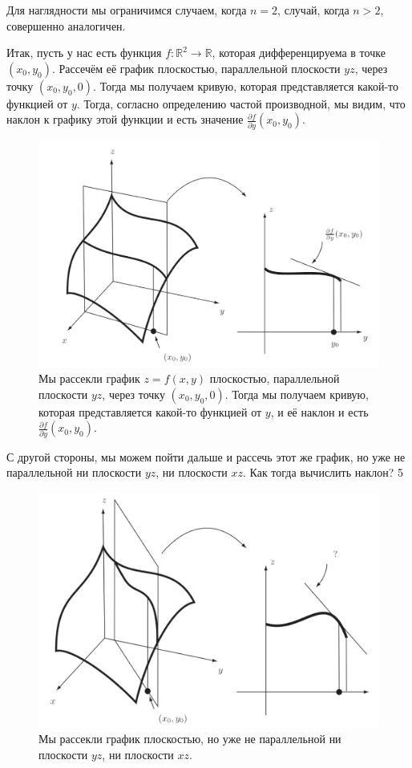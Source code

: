 Для наглядности мы ограничимся случаем, когда $n=2$, случай, когда $n >2$, совершенно аналогичен.

Итак, пусть у нас есть функция $f:\mathbb{R}^2 \to \mathbb{R}$, которая дифференцируема в точке $(x_0,y_0)$. Рассечём её график плоскостью, параллельной плоскости $yz$, через точку $(x_0,y_0,0)$. Тогда мы получаем кривую, которая представляется какой-то функцией от $y$. Тогда, согласно определению частой производной, мы видим, что наклон к графику этой функции и есть значение $\frac{\partial f}{\partial y}(x_0,y_0)$.

\begin{figure}[h!]
    \centering
    \includegraphics[scale = 0.6]{images/partial_deri.jpg}
    \caption{Мы рассекли график $z =f(x,y)$ плоскостью, параллельной плоскости $yz$, через точку $(x_0,y_0,0)$. Тогда мы получаем кривую, которая представляется какой-то функцией от $y$, и её наклон и есть $\frac{\partial f}{\partial y}(x_0,y_0)$.}
    \label{fig:enter-label}
\end{figure}

С другой стороны, мы можем пойти дальше и рассечь этот же график, но уже не параллельной ни плоскости $yz$, ни плоскости $xz$. Как тогда вычислить наклон?
5
\begin{figure}[h!]
    \centering
    \includegraphics[scale=0.6]{images/direction_der.jpg}
    \caption{Мы рассекли график плоскостью, но уже не параллельной ни плоскости $yz$, ни плоскости $xz$.}
    \label{fig:enter-label}
\end{figure}

